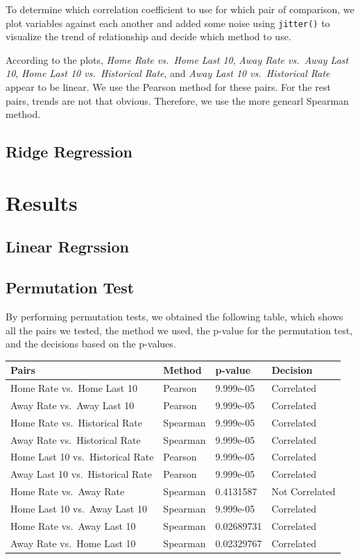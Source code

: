 \documentclass[]{article}
\begin{document}
To determine which correlation coefficient to use for which pair of
comparison, we plot variables against each another and added some noise
using \texttt{jitter()} to visualize the trend of relationship and
decide which method to use.

According to the plots, \emph{Home Rate vs.~Home Last 10}, \emph{Away
Rate vs.~Away Last 10}, \emph{Home Last 10 vs.~Historical Rate}, and
\emph{Away Last 10 vs.~Historical Rate} appear to be linear. We use the
Pearson method for these pairs. For the rest pairs, trends are not that
obvious. Therefore, we use the more genearl Spearman method.

\hypertarget{ridge-regression}{%
\subsection{Ridge Regression}\label{ridge-regression}}

\hypertarget{results}{%
\section{Results}\label{results}}

\hypertarget{linear-regrssion}{%
\subsection{Linear Regrssion}\label{linear-regrssion}}

\hypertarget{permutation-test-1}{%
\subsection{Permutation Test}\label{permutation-test-1}}

By performing permutation tests, we obtained the following table, which
shows all the pairs we tested, the method we used, the p-value for the
permutation test, and the decisions based on the p-values.

\begin{longtable}[]{@{}llll@{}}
\toprule
Pairs & Method & p-value & Decision\tabularnewline
\midrule
\endhead
Home Rate vs.~Home Last 10 & Pearson & 9.999e-05 &
Correlated\tabularnewline
Away Rate vs.~Away Last 10 & Pearson & 9.999e-05 &
Correlated\tabularnewline
Home Rate vs.~Historical Rate & Spearman & 9.999e-05 &
Correlated\tabularnewline
Away Rate vs.~Historical Rate & Spearman & 9.999e-05 &
Correlated\tabularnewline
Home Last 10 vs.~Historical Rate & Pearson & 9.999e-05 &
Correlated\tabularnewline
Away Last 10 vs.~Historical Rate & Pearson & 9.999e-05 &
Correlated\tabularnewline
Home Rate vs.~Away Rate & Spearman & 0.4131587 & Not
Correlated\tabularnewline
Home Last 10 vs.~Away Last 10 & Spearman & 9.999e-05 &
Correlated\tabularnewline
Home Rate vs.~Away Last 10 & Spearman & 0.02689731 &
Correlated\tabularnewline
Away Rate vs.~Home Last 10 & Spearman & 0.02329767 &
Correlated\tabularnewline
\bottomrule
\end{longtable}
\end{document}
